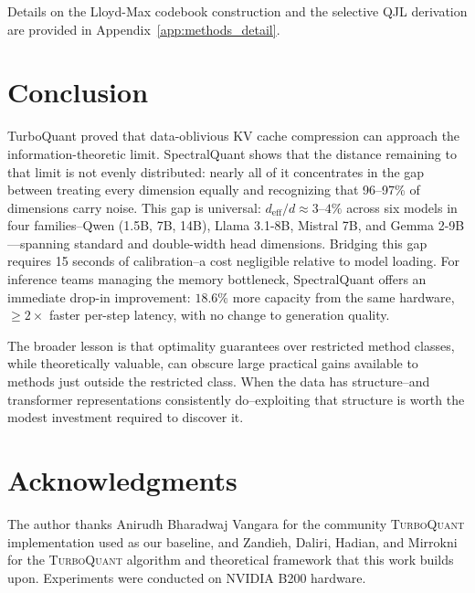 \documentclass[11pt]{article}
\newcommand{\deff}{d_{\mathrm{eff}}}
\newcommand{\TQ}{\textsc{TurboQuant}}
\begin{document}
Details on the Lloyd-Max codebook construction and the selective QJL
derivation are provided in Appendix~\ref{app:methods_detail}.

\section{Conclusion}
\label{sec:conclusion}

TurboQuant proved that data-oblivious KV cache compression can approach the
information-theoretic limit.  SpectralQuant shows that the distance remaining
to that limit is not evenly distributed: nearly all of it concentrates in the
gap between treating every dimension equally and recognizing that 96--97\% of
dimensions carry noise.  This gap is universal: $\deff/d \approx 3$--$4\%$
across six models in four families--Qwen (1.5B, 7B, 14B), Llama 3.1-8B,
Mistral 7B, and Gemma 2-9B---spanning standard and double-width head
dimensions.  Bridging this gap requires 15 seconds of calibration--a cost
negligible relative to model loading.  For inference teams managing the memory
bottleneck, SpectralQuant offers an immediate drop-in improvement: $18.6\%$
more capacity from the same hardware, $\geq 2\times$ faster per-step latency,
with no change to generation quality.

The broader lesson is that optimality guarantees over restricted method
classes, while theoretically valuable, can obscure large practical gains
available to methods just outside the restricted class.  When the data has
structure--and transformer representations consistently do--exploiting that
structure is worth the modest investment required to discover it.

\section*{Acknowledgments}

The author thanks Anirudh Bharadwaj Vangara for the community \TQ{}
implementation used as our baseline, and Zandieh, Daliri, Hadian, and
Mirrokni for the \TQ{} algorithm and theoretical framework that this work
builds upon.  Experiments were conducted on NVIDIA B200 hardware.



\end{document}
